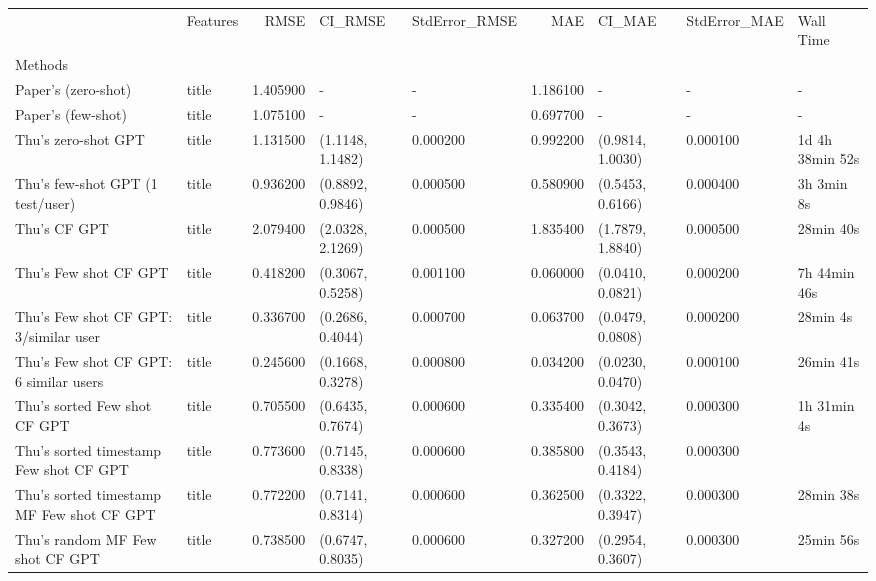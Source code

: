 \begin{tabular}{llrllrlll}
 & Features & RMSE & CI_RMSE & StdError_RMSE & MAE & CI_MAE & StdError_MAE & Wall Time \\
Methods &  &  &  &  &  &  &  &  \\
Paper's (zero-shot) & title & 1.405900 & - & - & 1.186100 & - & - & - \\
Paper's (few-shot) & title & 1.075100 & - & - & 0.697700 & - & - & - \\
Thu's zero-shot GPT & title & 1.131500 & (1.1148, 1.1482) & 0.000200 & 0.992200 & (0.9814, 1.0030) & 0.000100 & 1d 4h 38min 52s \\
Thu's few-shot GPT (1 test/user) & title & 0.936200 & (0.8892, 0.9846) & 0.000500 & 0.580900 & (0.5453, 0.6166) & 0.000400 & 3h 3min 8s \\
Thu's CF GPT & title & 2.079400 & (2.0328, 2.1269) & 0.000500 & 1.835400 & (1.7879, 1.8840) & 0.000500 & 28min 40s \\
Thu's Few shot CF GPT & title & 0.418200 & (0.3067, 0.5258) & 0.001100 & 0.060000 & (0.0410, 0.0821) & 0.000200 & 7h 44min 46s \\
Thu's Few shot CF GPT: 3/similar user & title & 0.336700 & (0.2686, 0.4044) & 0.000700 & 0.063700 & (0.0479, 0.0808) & 0.000200 & 28min 4s \\
Thu's Few shot CF GPT: 6 similar users & title & 0.245600 & (0.1668, 0.3278) & 0.000800 & 0.034200 & (0.0230, 0.0470) & 0.000100 & 26min 41s \\
Thu's sorted Few shot CF GPT & title & 0.705500 & (0.6435, 0.7674) & 0.000600 & 0.335400 & (0.3042, 0.3673) & 0.000300 & 1h 31min 4s \\
Thu's sorted timestamp Few shot CF GPT & title & 0.773600 & (0.7145, 0.8338) & 0.000600 & 0.385800 & (0.3543, 0.4184) & 0.000300 &  \\
Thu's sorted timestamp MF Few shot CF GPT & title & 0.772200 & (0.7141, 0.8314) & 0.000600 & 0.362500 & (0.3322, 0.3947) & 0.000300 & 28min 38s \\
Thu's random MF Few shot CF GPT & title & 0.738500 & (0.6747, 0.8035) & 0.000600 & 0.327200 & (0.2954, 0.3607) & 0.000300 & 25min 56s \\
\end{tabular}
